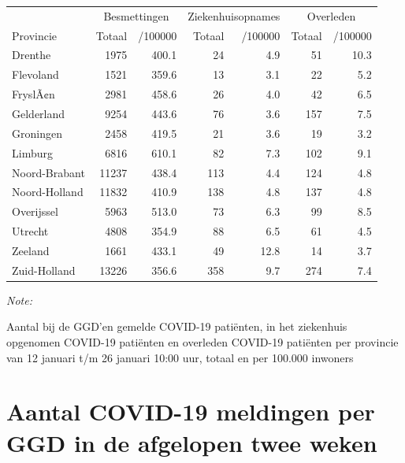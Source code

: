\documentclass[
  english,
  man,floatsintext]{apa6}
\begin{document}
\begin{table}[H]
\centering
\begin{threeparttable}
\begin{tabular}{lrrrrrr}
\toprule
\multicolumn{1}{c}{ } & \multicolumn{2}{c}{Besmettingen} & \multicolumn{2}{c}{Ziekenhuisopnames} & \multicolumn{2}{c}{Overleden} \\
\cmidrule(l{3pt}r{3pt}){2-3} \cmidrule(l{3pt}r{3pt}){4-5} \cmidrule(l{3pt}r{3pt}){6-7}
Provincie & Totaal & /100000 & Totaal & /100000 & Totaal & /100000\\
\midrule
Drenthe & 1975 & 400.1 & 24 & 4.9 & 51 & 10.3\\
Flevoland & 1521 & 359.6 & 13 & 3.1 & 22 & 5.2\\
FryslÃ¢n & 2981 & 458.6 & 26 & 4.0 & 42 & 6.5\\
Gelderland & 9254 & 443.6 & 76 & 3.6 & 157 & 7.5\\
Groningen & 2458 & 419.5 & 21 & 3.6 & 19 & 3.2\\
Limburg & 6816 & 610.1 & 82 & 7.3 & 102 & 9.1\\
Noord-Brabant & 11237 & 438.4 & 113 & 4.4 & 124 & 4.8\\
Noord-Holland & 11832 & 410.9 & 138 & 4.8 & 137 & 4.8\\
Overijssel & 5963 & 513.0 & 73 & 6.3 & 99 & 8.5\\
Utrecht & 4808 & 354.9 & 88 & 6.5 & 61 & 4.5\\
Zeeland & 1661 & 433.1 & 49 & 12.8 & 14 & 3.7\\
Zuid-Holland & 13226 & 356.6 & 358 & 9.7 & 274 & 7.4\\
\bottomrule
\end{tabular}
\begin{tablenotes}
\item \textit{Note: } 
\item Aantal bij de GGD’en gemelde COVID-19 patiënten, in het ziekenhuis opgenomen COVID-19 patiënten en overleden COVID-19 patiënten per provincie van 12 januari t/m 26 januari 10:00 uur, totaal en per 100.000 inwoners
\end{tablenotes}
\end{threeparttable}
\end{table}

\newpage

\hypertarget{aantal-covid-19-meldingen-per-ggd-in-de-afgelopen-twee-weken}{%
\section{Aantal COVID-19 meldingen per GGD in de afgelopen twee weken}\label{aantal-covid-19-meldingen-per-ggd-in-de-afgelopen-twee-weken}}
\end{document}
